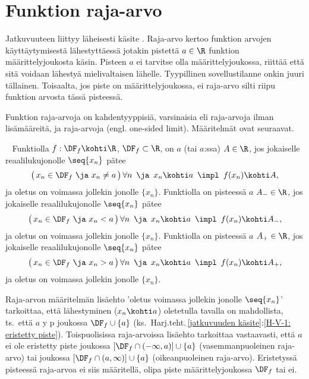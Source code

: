 \section{Funktion raja-arvo} \label{funktion raja-arvo} \alku
 
Jatkuvuuteen liittyy läheisesti käsite . Raja-arvo kertoo funktion 
arvojen käyttäytymisestä lähestyttäessä jotakin pistettä $a\in\R$ funktion määrittelyjoukosta 
käsin. Pisteen $a$ ei tarvitse olla määrittelyjoukossa, riittää että sitä voidaan lähestyä 
mielivaltaisen lähelle. Tyypillinen sovellustilanne onkin juuri tällainen. Toisaalta, jos
piste on määrittelyjoukossa, ei raja-arvo silti riipu funktion arvosta tässä pisteessä.

Funktion raja-arvoja on kahdentyyppisiä, varsinaisia eli raja-arvoja ilman lisämääreitä, ja 
%
 raja-arvoja (engl. one-sided limit). Määritelmät ovat seuraavat.
\begin{Def} \ \label{funktion raja-arvon määritelmä}
 
 
Funktiolla $f:\DF_f\kohti\R$, $\DF_f\subset\R$, on  $a$ (tai $a$:ssa) 
 $A\in\R$, jos jokaiselle reaalilukujonolle $\seq{x_n}$ pätee
\[
\bigl(\,x_n\in\DF_f\ \ja\ x_n\neq a\,\bigr)\,\forall n\,\ \ja\,\ x_n\kohti a\,\ 
                          \impl\,\ f(x_n)\kohti A,
\]
ja oletus on voimassa jollekin jonolle $\{x_n\}$. Funktiolla on pisteessä $a$ 
\kor{vasemmanpuoleinen raja-arvo} $A_-\in\R$, jos jokaiselle reaalilukujonolle $\seq{x_n}$
pätee
\[
\bigl(\,x_n\in\DF_f\ \ja\ x_n< a\,\bigr)\,\forall n\,\ \ja\,\ x_n\kohti a\,\ 
                          \impl\,\ f(x_n)\kohti A_-,
\]
ja oletus on voimassa jollekin jonolle $\{x_n\}$. Funktiolla on pisteessä $a$
 $A_+\in\R$, jos jokaiselle reaalilukujonolle $\seq{x_n}$
pätee
\[
\bigl(\,x_n\in\DF_f\ \ja\ x_n> a\,\bigr)\,\forall n\,\ \ja\,\ x_n\kohti a\,\
                          \impl\,\ f(x_n)\kohti A_+,
\]
ja oletus on voimassa jollekin jonolle $\{x_n\}$.
\end{Def}
Raja-arvon määritelmän lisäehto 'oletus voimassa jollekin jonolle $\seq{x_n}$' tarkoittaa,
että lähestyminen ($x_n \kohti a$) oletetulla tavalla on mahdollista, ts.\ että $a$ 
\pain{ole} y p joukossa $\DF_f \cup \{a\}$
(ks.\ Harj.teht.\,\ref{jatkuvuuden käsite}:\ref{H-V-1: eristetty piste}). Toispuolisissa
raja-arvoissa lisäehto tarkoittaa vastaavasti, että $a$ ei ole eristetty piste joukossa
$[\DF_f\cap(-\infty,a)]\cup\{a\}$ (vasemmanpuoleinen raja-arvo) tai joukossa
$[\DF_f\cap(a,\infty)]\cup\{a\}$ (oikeanpuoleinen raja-arvo). Eristetyssä pisteessä
raja-arvoa ei siis määritellä, olipa piste määrittelyjoukossa $\DF_f$ tai ei.

